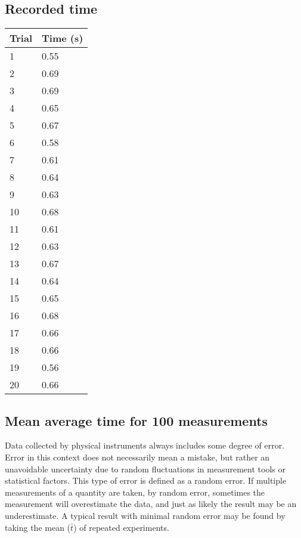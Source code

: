\documentclass[11pt, letterpaper, includehead]{article}
\begin{document}
\subsection{Recorded time} %
\begin{center}
  \begin{tabular}[H]{| m{2cm} | m{2cm} |}
    \hline
    \textbf{Trial} & \textbf{Time (s)} \\ [0.5ex]
    \hline
    1              & 0.55              \\
    \hline
    2              & 0.69              \\
    \hline
    3              & 0.69              \\
    \hline
    4              & 0.65              \\
    \hline
    5              & 0.67              \\
    \hline
    6              & 0.58              \\
    \hline
    7              & 0.61              \\
    \hline
    8              & 0.64              \\
    \hline
    9              & 0.63              \\
    \hline
    10             & 0.68              \\
    \hline
    11             & 0.61              \\
    \hline
    12             & 0.63              \\
    \hline
    13             & 0.67              \\
    \hline
    14             & 0.64              \\
    \hline
    15             & 0.65              \\
    \hline
    16             & 0.68              \\
    \hline
    17             & 0.66              \\
    \hline
    18             & 0.66              \\
    \hline
    19             & 0.56              \\
    \hline
    20             & 0.66              \\
    \hline
  \end{tabular}
\end{center}

\setcounter{subsection}{3} %
\subsection{Mean average time for 100 measurements} %
Data collected by physical instruments always includes some degree 
of error. Error in this context does not necessarily mean a mistake, 
but rather an unavoidable uncertainty due to random fluctuations in 
measurement tools or statistical factors. This type of error is 
defined as a random error. If multiple measurements of a quantity 
are taken, by random error, sometimes the measurement will overestimate 
the data, and just as likely the result may be an underestimate. A 
typical result with minimal random error may be found by taking the 
mean ($\bar{t}$) of repeated experiments. 
\end{document}
